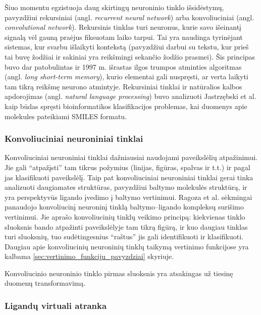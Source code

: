 Šiuo momentu egzistuoja daug skirtingų neuroninio tinklo išsidėstymų, pavyzdžiui rekursiniai (angl. \textit{recurrent neural network}) arba konvoliuciniai (angl. \textit{convolutional network}). Rekursinis tinklas turi neuronus, kurie savo išeinantį signalą vėl gauną praėjus fiksuotam laiko tarpui. Tai yra naudinga tyrinėjant sistemas, kur svarbu išlaikyti kontekstą (pavyzdžiui darbui su tekstu, kur prieš tai buvę žodžiai ir sakiniai yra reikšmingi sekančio žodžio prasmei). Šis principas buvo dar patobulintas ir 1997 m. išrastas ilgos trumpos atminties algoritmas (angl. \textit{long short-term memory}), kurio elementai gali nuspręsti, ar verta laikyti tam tikrą reikšmę neurono atmintyje. Rekursiniai tinklai ir natūralios kalbos apdorojimas (angl. \textit{natural language processing}) buvo analizuoti Jastrzębski et al.\cite{jastrzebski_learning_2018} kaip būdas spręsti bioinformatikos klasifikacijos problemas, kai duomenys apie molekules pateikiami SMILES formatu.

\subsubsection{Konvoliuciniai neuroniniai tinklai}

Konvoliuciniai neuroniniai tinklai dažniausiai naudojami paveikslėlių atpažinimui. Jie gali \enquote{atpažįsti} tam tikrus požymius (linijas, figūras, spalvas ir t.t.) ir pagal jas klasifikuoti paveikslėlį. Taip pat konvoliuciniai neuroniniai tinklai gerai tinka analizuoti daugiamates struktūras, pavyzdžiui baltymo molekulės struktūrą, ir yra perspektyvūs ligando įvedimo į baltymo vertinimui.\cite{hochuli_visualizing_2018} Ragoza et al.\cite{ragoza_proteinligand_2017} sėkmingai panaudojo konvoliucinį neuroninį tinklą baltymo--ligando kompleksų surišimo vertinimui. Jie aprašo konvoliucinių tinklų veikimo principą: kiekvienas tinklo sluoksnis bando atpažinti paveikslėlyje tam tikrą figūrą, ir kuo daugiau tinklas turi sluoksnių, tuo sudėtingesnius \enquote{raštus} jis gali identifikuoti ir klasifikuoti. Daugiau apie konvoliucinių neuroninių tinklų taikymą vertinimo funkcijose yra kalbama \ref{sec:vertinimo_funkciju_pavyzdziai} skyriuje.

Konvoliucinio neuroninio tinklo pirmas sluoksnis yra atsakingas už tiesinę duomenų transformavimą. 


\subsubsection{Ligandų virtuali atranka}

